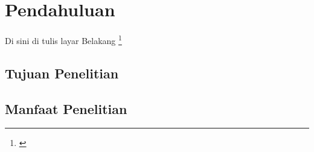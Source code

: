 \section {Pendahuluan}

Di sini di tulis layar Belakang \footnote{\cite{crow_case_2002}}

\subsection {Tujuan Penelitian}

\subsection {Manfaat Penelitian}

